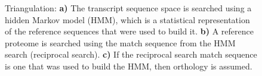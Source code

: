 \begin{figure}[t]
	\centering
	\def\svgwidth{0.8\textwidth}
	
	\caption[Triangulation]{Triangulation:
		\textbf{a)} The transcript sequence space is searched using a hidden Markov
			model (HMM), which is a statistical representation of the reference
			sequences that were used to build it.
		\textbf{b)} A reference proteome is searched using the match sequence from the
			HMM search (reciprocal search).
		\textbf{c)} If the reciprocal search match sequence is one that was used to
			build the HMM, then orthology is assumed.
	}
	\label{fig:hamstr-triangulation}
\end{figure}


